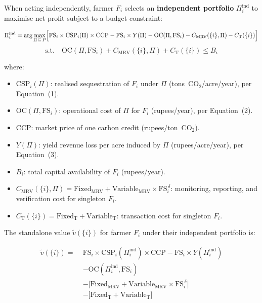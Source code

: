 \documentclass[manuscript, screen, review, anonymous]{acmart}
\begin{document}
When acting independently, farmer $F_i$ selects an \textbf{independent
portfolio} $\Pi_i^{\text{ind}}$ to maximise net profit subject to a budget
constraint:

\begin{equation}
\Pi_i^{\text{ind}} = \arg\max_{\Pi \,\subseteq\, P}
\Bigl[
    \text{FS}_i \times \text{CSP}_i(\Pi) \times \text{CCP}
    - \text{FS}_i \times Y(\Pi)
    - \text{OC}(\Pi, \text{FS}_i)
    - C_{\text{MRV}}(\{i\}, \Pi)
    - C_{\text{T}}(\{i\})
\Bigr]
\end{equation}
\begin{equation*}
    \text{s.t.} \quad \text{OC}(\Pi, \text{FS}_i)
    + C_{\text{MRV}}(\{i\}, \Pi)
    + C_{\text{T}}(\{i\}) \leq B_i
\end{equation*}

\noindent where:
\begin{itemize}
    \item $\text{CSP}_i(\Pi)$: realised sequestration of $F_i$ under $\Pi$
          (tons~CO$_2$/acre/year), per Equation~(1).
    \item $\text{OC}(\Pi, \text{FS}_i)$: operational cost of $\Pi$ for $F_i$
          (rupees/year), per Equation~(2).
    \item $\text{CCP}$: market price of one carbon credit (rupees/ton~CO$_2$).
    \item $Y(\Pi)$: yield revenue loss per acre induced by $\Pi$
          (rupees/acre/year), per Equation~(3).
    \item $B_i$: total capital availability of $F_i$ (rupees/year).
    \item $C_{\text{MRV}}(\{i\}, \Pi) = \text{Fixed}_{\text{MRV}}
          + \text{Variable}_{\text{MRV}} \times \text{FS}_i^{\,\delta}$:
          monitoring, reporting, and verification cost for singleton $F_i$.
    \item $C_{\text{T}}(\{i\}) = \text{Fixed}_{\text{T}} + \text{Variable}_{\text{T}}$:
          transaction cost for singleton $F_i$.
\end{itemize}

The standalone value $\tilde{v}(\{i\})$ for farmer $F_i$ under their
independent portfolio is:

\begin{equation}
\begin{split}
\tilde{v}\!\left(\{i\}\right) = \;
    & \text{FS}_i \times \text{CSP}_i(\Pi_i^{\text{ind}}) \times \text{CCP}
      - \text{FS}_i \times Y(\Pi_i^{\text{ind}}) \\
    & - \text{OC}(\Pi_i^{\text{ind}}, \text{FS}_i) \\
    & - \bigl[\text{Fixed}_{\text{MRV}} + \text{Variable}_{\text{MRV}} \times \text{FS}_i^{\,\delta}\bigr] \\
    & - \bigl[\text{Fixed}_{\text{T}} + \text{Variable}_{\text{T}}\bigr]
\end{split}
\end{equation}
\end{document}
